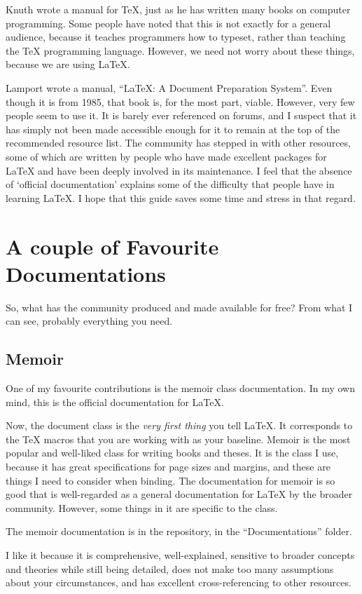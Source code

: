 \documentclass[11pt, oneside]{memoir}
\begin{document}
Knuth wrote a manual for TeX, just as he has written many books on computer programming. Some people have noted that this is not exactly for a general audience, because it teaches programmers how to typeset, rather than teaching the TeX programming language. However, we need not worry about these things, because we are using LaTeX.

Lamport wrote a manual, ``LaTeX: A Document Preparation System''. Even though it is from 1985, that book is, for the most part, viable. However, very few people seem to use it. It is barely ever referenced on forums, and I suspect that it has simply not been made accessible enough for it to remain at the top of the recommended resource list. The community has stepped in with other resources, some of which are written by people who have made excellent packages for LaTeX and have been deeply involved in its maintenance. I feel that the absence of `official documentation' explains some of the difficulty that people have in learning LaTeX. I hope that this guide saves some time and stress in that regard.

\section{A couple of Favourite Documentations}
So, what has the community produced and made available for free? From what I can see, probably everything you need.

\subsection{Memoir}

One of my favourite contributions is the memoir class documentation. In my own mind, this is the official documentation for LaTeX.

Now, the document class is the \emph{very first thing} you tell LaTeX. It corresponds to the TeX macros that you are working with as your baseline. Memoir is the most popular and well-liked class for writing books and theses. It is the class I use, because it has great specifications for page sizes and margins, and these are things I need to consider when binding. The documentation for memoir is so good that is well-regarded as a general documentation for LaTeX by the broader community. However, some things in it are specific to the class.

The memoir documentation is in the repository, in the  ``Documentations'' folder. 

I like it because it is comprehensive, well-explained, sensitive to broader concepts and theories while still being detailed, does not make too many assumptions about your circumstances, and has excellent cross-referencing to other resources.
\end{document}
